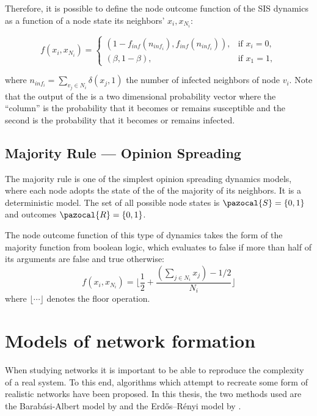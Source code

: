 Therefore, it is possible to define the node outcome function of the SIS
dynamics as a function of a node state its neighbors' $x_i, x_{N_i}$:

\begin{equation}
  \label{eq:sis}
  f(x_i, x_{N_i}) = \begin{cases}
                      (1 - f_{inf}(n_{inf_i}), f_{inf}(n_{inf_i})), &\text{if } x_i=0, \\
                       (\beta, 1 - \beta), & \text{if } x_1 = 1,                                                          
                    \end{cases}
\end{equation}

where $n_{inf_i} = \sum_{v_j \in N_i}\delta (x_j, 1)$ the number of infected
neighbors of node $v_i$. Note that the output of the  is a two
dimensional probability vector where the ``column'' is the probability that it
becomes or remains susceptible and the second is the probability that it becomes
or remains infected.

\subsection{Majority Rule --- Opinion Spreading}

The majority rule is one of the simplest opinion spreading dynamics
models, where each node adopts the state of the of the majority of
its neighbors. It is a deterministic model. The set of all possible node
states is $\pazocal{S} = \{0, 1\}$ and outcomes $\pazocal{R} = \{0, 1\}$.

The node outcome function of this type of dynamics takes the form
of the majority function from boolean logic, which evaluates to false
if more than half of its arguments are false and true otherwise:
\begin{equation}
  \label{eq:majority}
  f(x_i, x_{N_i}) = \biggl\lfloor \frac{1}{2} + \frac{(\sum_{j \in N_i}x_j) - 1/2}{N_i} \biggr \rfloor
\end{equation}
where $\lfloor \cdots \rfloor$ denotes the floor operation.

\section{Models of network formation}\label{sec:creating_nw}

When studying networks it is important to be able to reproduce the complexity
of a real system. To this end, algorithms which attempt to recreate some form
of realistic networks have been proposed. In this thesis, the two methods used
are the Barab{\'a}si-Albert model by \citet{albert2002statistical} and the
Erdős–Rényi model by \citet{erdHos1960evolution}.

